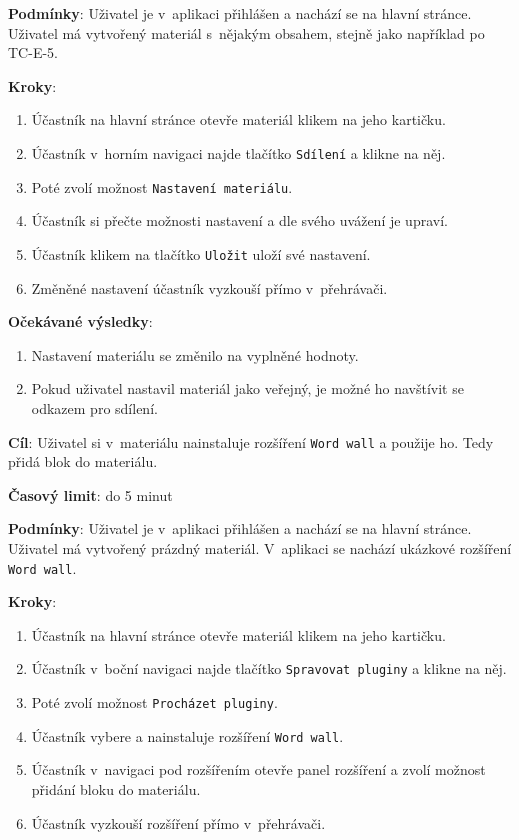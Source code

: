 \textbf{Podmínky}:  Uživatel je v~aplikaci přihlášen a nachází se na hlavní stránce.  Uživatel má vytvořený materiál s~nějakým obsahem, stejně jako například po TC-E-5.

\textbf{Kroky}:

\begin{enumerate}[leftmargin=1.4cm]
    \item Účastník na hlavní stránce otevře materiál klikem na jeho kartičku.
    \item Účastník v~horním navigaci najde tlačítko \verb|Sdílení| a klikne na něj.
    \item Poté zvolí možnost \verb|Nastavení materiálu|.
    \item Účastník si přečte možnosti nastavení a dle svého uvážení je upraví. 
    \item Účastník klikem na tlačítko \verb|Uložit| uloží své nastavení.
    \item Změněné nastavení účastník vyzkouší přímo v~přehrávači.
\end{enumerate}

\textbf{Očekávané výsledky}:

\begin{enumerate}[leftmargin=1.4cm]
    \item Nastavení materiálu se změnilo na vyplněné hodnoty.
    \item Pokud uživatel nastavil materiál jako veřejný, je možné ho navštívit se odkazem pro sdílení.
\end{enumerate}




\vspace{1em}

\textbf{Cíl}: Uživatel si v~materiálu nainstaluje rozšíření \verb|Word wall| a použije ho. Tedy přidá blok do materiálu.

\textbf{Časový limit}: do 5 minut

\textbf{Podmínky}:  Uživatel je v~aplikaci přihlášen a nachází se na hlavní stránce.  Uživatel má vytvořený prázdný materiál. V~aplikaci se nachází ukázkové rozšíření \verb|Word wall|.

\textbf{Kroky}:

\begin{enumerate}[leftmargin=1.4cm]
    \item Účastník na hlavní stránce otevře materiál klikem na jeho kartičku.
    \item Účastník v~boční navigaci najde tlačítko \verb|Spravovat pluginy| a klikne na něj.
    \item Poté zvolí možnost \verb|Procházet pluginy|.
    \item Účastník vybere a nainstaluje rozšíření \verb|Word wall|.
    \item Účastník v~navigaci pod rozšířením otevře panel rozšíření a zvolí možnost přidání bloku do materiálu.
    \item Účastník vyzkouší rozšíření přímo v~přehrávači.
\end{enumerate}

